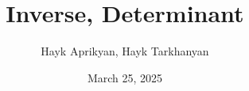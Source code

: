 \documentclass{beamer}
\title[Lecture 3]{Inverse, Determinant}
\author[Aprikyan, Tarkhanyan]{Hayk Aprikyan, Hayk Tarkhanyan}
\date{March 25, 2025}
\newcommand{\vc}{\mathbf{c}}
\newcommand{\vv}{\mathbf{v}}
\newcommand{\R}{\mathbb{R}}
\begin{document}
\begin{frame}
  \titlepage
\end{frame}






  



\end{document}
